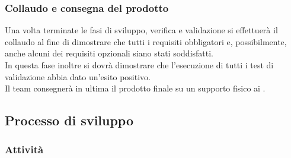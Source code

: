 \subsubsection{Collaudo e consegna del prodotto}
Una volta terminate le fasi di sviluppo, verifica e validazione si effettuerà il collaudo al fine di dimostrare che tutti i requisiti obbligatori e, possibilmente, anche alcuni dei requisiti opzionali siano stati soddisfatti. 
\\In questa fase inoltre si dovrà dimostrare che l'esecuzione di tutti i test di validazione abbia dato un'esito positivo.
\\Il team consegnerà in ultima il prodotto finale su un supporto fisico ai \committenti.

\subsection{Processo di sviluppo}
\subsubsection{Attività}
